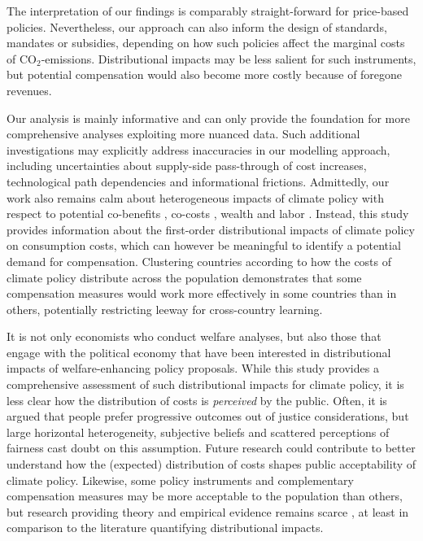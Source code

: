 \documentclass[12pt, a4paper]{article}
\begin{document}
The interpretation of our findings is comparably straight-forward for price-based policies. Nevertheless, our approach can also inform the design of standards, mandates or subsidies, depending on how such policies affect the marginal costs of CO$_{2}$-emissions. Distributional impacts may be less salient for such instruments, but potential compensation would also become more costly because of foregone revenues. %

Our analysis is mainly informative and can only provide the foundation for more comprehensive analyses exploiting more nuanced data. Such additional investigations may explicitly address inaccuracies in our modelling approach, including uncertainties about supply-side pass-through of cost increases, technological path dependencies and informational frictions. Admittedly, our work also remains calm about heterogeneous impacts of climate policy with respect to potential co-benefits \autocite[e.g.][]{Holland.2019,Karlsson.2020}, co-costs \autocite[e.g.][]{Fuje.2019,Greve.2022}, wealth \autocite[e.g.][]{Fullerton.2011} and labor \autocite[e.g.][]{Castellanos.2024}. Instead, this study provides information about the first-order distributional impacts of climate policy on consumption costs, which can however be meaningful to identify a potential demand for compensation. Clustering countries according to how the costs of climate policy distribute across the population demonstrates that some compensation measures would work more effectively in some countries than in others, potentially restricting leeway for cross-country learning. %

It is not only economists who conduct welfare analyses, but also those that engage with the political economy that have been interested in distributional impacts of welfare-enhancing policy proposals. While this study provides a comprehensive assessment of such distributional impacts for climate policy, it is less clear how the distribution of costs is \textit{perceived} by the public. Often, it is argued that people prefer progressive outcomes out of justice considerations, but large horizontal heterogeneity, subjective beliefs \autocite{Douenne.2020} and scattered perceptions of fairness \autocite{MaestreAndres.2019,Povitkina.2021} cast doubt on this assumption. Future research could contribute to better understand how the (expected) distribution of costs shapes public acceptability of climate policy. Likewise, some policy instruments and complementary compensation measures may be more acceptable to the population than others, but research providing theory and empirical evidence remains scarce \autocite[e.g.][]{Sommer.2022,Valencia.2023}, at least in comparison to the literature quantifying distributional impacts. 
\end{document}
